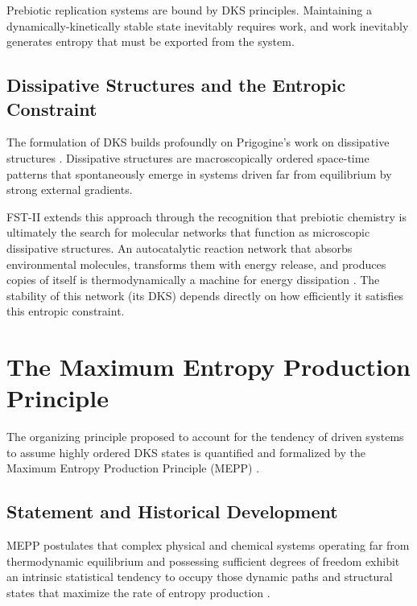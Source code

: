 \documentclass[12pt,a4paper]{article}
\theoremstyle{remark}
\begin{document}
Prebiotic replication systems are bound by DKS principles. Maintaining a dynamically-kinetically stable state inevitably requires work, and work inevitably generates entropy that must be exported from the system.

\subsection{Dissipative Structures and the Entropic Constraint}

The formulation of DKS builds profoundly on Prigogine's work on dissipative structures \citep{Bioenergetics}. Dissipative structures are macroscopically ordered space-time patterns that spontaneously emerge in systems driven far from equilibrium by strong external gradients.

FST-II extends this approach through the recognition that prebiotic chemistry is ultimately the search for molecular networks that function as microscopic dissipative structures. An autocatalytic reaction network that absorbs environmental molecules, transforms them with energy release, and produces copies of itself is thermodynamically a machine for energy dissipation \citep{Bioenergetics}. The stability of this network (its DKS) depends directly on how efficiently it satisfies this entropic constraint.

\section{The Maximum Entropy Production Principle}
\label{sec:mepp}

The organizing principle proposed to account for the tendency of driven systems to assume highly ordered DKS states is quantified and formalized by the Maximum Entropy Production Principle (MEPP) \citep{EntropyMEPP,MEPP2006}.

\subsection{Statement and Historical Development}

MEPP postulates that complex physical and chemical systems operating far from thermodynamic equilibrium and possessing sufficient degrees of freedom exhibit an intrinsic statistical tendency to occupy those dynamic paths and structural states that maximize the rate of entropy production \citep{ThermodynamicsOrganisms}.
\end{document}
